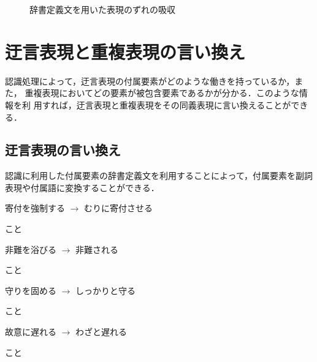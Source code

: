 \documentclass{nlp}
\begin{document}
\begin{figure*}[h]
 \begin{center}
  \caption{辞書定義文を用いた表現のずれの吸収}
  \label{Fig:gap}
 \end{center}
\end{figure*}


\section{迂言表現と重複表現の言い換え}
認識処理によって，迂言表現の付属要素がどのような働きを持っているか，また，
重複表現においてどの要素が被包含要素であるかが分かる．このような情報を利
用すれば，迂言表現と重複表現をその同義表現に言い換えることができる．

\subsection{迂言表現の言い換え}
認識に利用した付属要素の辞書定義文を利用することによって，付属要素を副詞
表現や付属語に変換することができる．
\begin{EXAMPLE}
 \item 寄付を強制する $\rightarrow$ むりに寄付させる 

 \hspace{10pt}{\bf 強制} \hspace{10pt}
 こと
 
 \item 非難を浴びる $\rightarrow$ 非難される 

  \hspace{10pt}{\bf 浴びる} \hspace{10pt}こと
 
 \item 守りを固める $\rightarrow$ しっかりと守る 

  \hspace{10pt}{\bf 固める} \hspace{10pt}
 こと
 
 \item 故意に遅れる $\rightarrow$ わざと遅れる 

  \hspace{10pt}{\bf 故意} \hspace{10pt}
 こと
\end{EXAMPLE}
\end{document}

